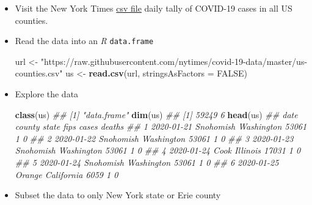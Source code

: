 \documentclass[
]{book}
\newenvironment{Shaded}{\begin{snugshade}}{\end{snugshade}}
\newcommand{\CommentTok}[1]{\textcolor[rgb]{0.56,0.35,0.01}{\textit{#1}}}
\newcommand{\DataTypeTok}[1]{\textcolor[rgb]{0.13,0.29,0.53}{#1}}
\newcommand{\KeywordTok}[1]{\textcolor[rgb]{0.13,0.29,0.53}{\textbf{#1}}}
\newcommand{\NormalTok}[1]{#1}
\newcommand{\OperatorTok}[1]{\textcolor[rgb]{0.81,0.36,0.00}{\textbf{#1}}}
\newcommand{\OtherTok}[1]{\textcolor[rgb]{0.56,0.35,0.01}{#1}}
\newcommand{\StringTok}[1]{\textcolor[rgb]{0.31,0.60,0.02}{#1}}
\begin{document}
\begin{itemize}
\item
  Visit the New York Times \href{https://raw.githubusercontent.com/nytimes/covid-19-data/master/us-counties.csv}{csv file} daily tally of COVID-19 cases in all US counties.
\item
  Read the data into an \emph{R} \texttt{data.frame}

\begin{Shaded}
\begin{Highlighting}[]
\NormalTok{url <-}
\StringTok{  "https://raw.githubusercontent.com/nytimes/covid-19-data/master/us-counties.csv"}
\NormalTok{us <-}\StringTok{ }\KeywordTok{read.csv}\NormalTok{(url, }\DataTypeTok{stringsAsFactors =} \OtherTok{FALSE}\NormalTok{)}
\end{Highlighting}
\end{Shaded}
\item
  Explore the data

\begin{Shaded}
\begin{Highlighting}[]
\KeywordTok{class}\NormalTok{(us)}
\CommentTok{## [1] "data.frame"}
\KeywordTok{dim}\NormalTok{(us)}
\CommentTok{## [1] 59249     6}
\KeywordTok{head}\NormalTok{(us)}
\CommentTok{##         date    county      state  fips cases deaths}
\CommentTok{## 1 2020-01-21 Snohomish Washington 53061     1      0}
\CommentTok{## 2 2020-01-22 Snohomish Washington 53061     1      0}
\CommentTok{## 3 2020-01-23 Snohomish Washington 53061     1      0}
\CommentTok{## 4 2020-01-24      Cook   Illinois 17031     1      0}
\CommentTok{## 5 2020-01-24 Snohomish Washington 53061     1      0}
\CommentTok{## 6 2020-01-25    Orange California  6059     1      0}
\end{Highlighting}
\end{Shaded}
\item
  Subset the data to only New York state or Erie county

\begin{Shaded}
\end{Shaded}
\end{itemize}
\end{document}
